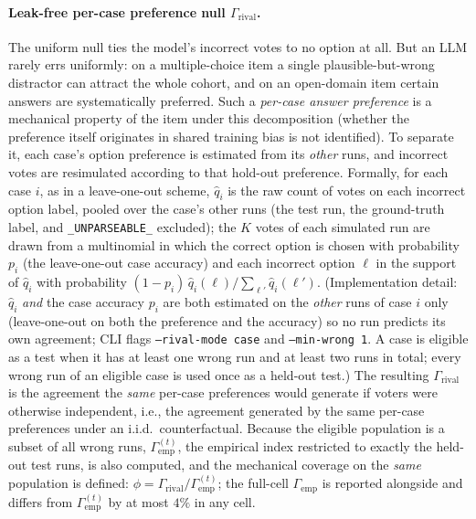 \documentclass{article}
\newcommand{\agreementIndex}{\Gamma}
\begin{document}
\paragraph{Leak-free per-case preference null $\agreementIndex_{\mathrm{rival}}$.}
The uniform null ties the model's incorrect votes to no option at all.
But an LLM rarely errs uniformly: on a multiple-choice item a single
plausible-but-wrong distractor can attract the whole cohort, and on an
open-domain item certain answers are systematically preferred. Such a
\emph{per-case answer preference} is a mechanical property of the item
under this decomposition (whether the preference itself originates in
shared training bias is not identified). To separate it, each case's option preference is estimated from its \emph{other} runs, and incorrect votes are
resimulated according to that hold-out preference. Formally, for each
case $i$, as in a leave-one-out scheme, $\hat q_i$ is the raw count of
votes on each incorrect option label, pooled over the case's other runs
(the test run, the ground-truth label, and \texttt{\_UNPARSEABLE\_}
excluded); the $K$ votes of each simulated run are drawn from a
multinomial in which the correct option is chosen with probability $p_i$
(the leave-one-out case accuracy) and each incorrect option $\ell$ in the
support of $\hat q_i$ with probability
$(1-p_i)\,\hat q_i(\ell)/\sum_{\ell'}\hat q_i(\ell')$. (Implementation detail:
$\hat q_i$ \emph{and} the case accuracy $p_i$ are both estimated on the
\emph{other} runs of case $i$ only (leave-one-out on both the
preference and the accuracy) so no
run predicts its own agreement; CLI flags \texttt{--rival-mode case} and
\texttt{--min-wrong 1}. A case is eligible as a test when it has at least
one wrong run and at least two runs in total; every wrong run of an
eligible case is used once as a held-out test.) The resulting
$\agreementIndex_{\mathrm{rival}}$ is the
agreement the \emph{same} per-case preferences would generate if voters
were otherwise independent, i.e., the agreement generated by the same
per-case preferences under an i.i.d.\ counterfactual. Because the eligible population is a
subset of all wrong runs, $\agreementIndex_{\mathrm{emp}}^{(t)}$, the empirical
index restricted to exactly the held-out test runs, is also computed,
and the mechanical coverage on the \emph{same} population is defined:
$\phi=\agreementIndex_{\mathrm{rival}}/\agreementIndex_{\mathrm{emp}}^{(t)}$; the
full-cell $\agreementIndex_{\mathrm{emp}}$ is reported alongside and differs from
$\agreementIndex_{\mathrm{emp}}^{(t)}$ by at most $4\%$ in any cell.
\end{document}
